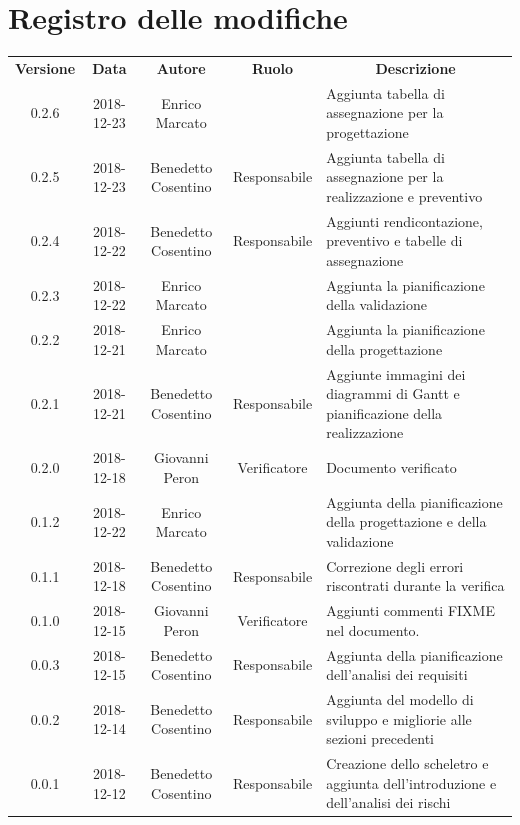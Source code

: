 \documentclass[11pt,a4paper]{article}
\begin{document}
	
	
	\newpage
	\section*{\centering Registro delle modifiche}
	\begin{tabularx}{\textwidth}{ c | c | c | c | X }
		\rowcolor{LightBlue}
		\color{white}\bfseries Versione & 
		\color{white}\bfseries Data & 
		\color{white}\bfseries Autore & 
		\color{white}\bfseries Ruolo & 
		\multicolumn{1}{c}{\color{white}\bfseries Descrizione}\\[0.25cm]

		0.2.6 & 2018-12-23 & Enrico Marcato &  & Aggiunta tabella di assegnazione per la progettazione\\
		0.2.5 & 2018-12-23 & Benedetto Cosentino & Responsabile & Aggiunta tabella di assegnazione per la realizzazione e preventivo\\
		0.2.4 & 2018-12-22 & Benedetto Cosentino & Responsabile & Aggiunti rendicontazione, preventivo e tabelle di assegnazione \\
		0.2.3 & 2018-12-22 & Enrico Marcato &  & Aggiunta la pianificazione della validazione\\
		0.2.2 & 2018-12-21 & Enrico Marcato &  & Aggiunta la pianificazione della progettazione\\
		0.2.1 & 2018-12-21 & Benedetto Cosentino & Responsabile & Aggiunte immagini dei diagrammi di Gantt e pianificazione della realizzazione\\
		0.2.0 & 2018-12-18 & Giovanni Peron & Verificatore & Documento verificato\\
		0.1.2 & 2018-12-22 & Enrico Marcato &  & Aggiunta della pianificazione della progettazione e della validazione\\
		0.1.1 & 2018-12-18 & Benedetto Cosentino & Responsabile & Correzione degli errori riscontrati durante la verifica\\
		0.1.0 & 2018-12-15 & Giovanni Peron & Verificatore & Aggiunti commenti FIXME nel documento.\\
		0.0.3 & 2018-12-15 & Benedetto Cosentino & Responsabile & Aggiunta della pianificazione dell'analisi dei requisiti\\
		0.0.2 & 2018-12-14 & Benedetto Cosentino & Responsabile & Aggiunta del modello di sviluppo e migliorie alle sezioni precedenti\\
		0.0.1 & 2018-12-12 & Benedetto Cosentino & Responsabile & Creazione dello scheletro e aggiunta dell'introduzione e dell'analisi dei rischi\\
	\end{tabularx}
	\newpage
	\tableofcontents
	\newpage	
\end{document}
